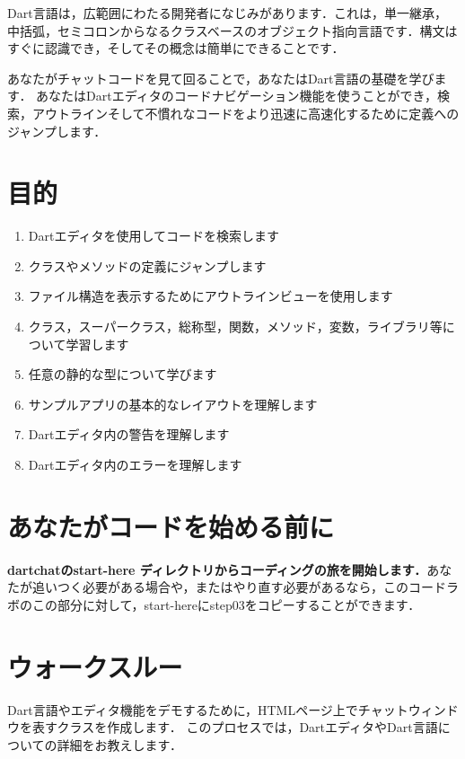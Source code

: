 
Dart言語は，広範囲にわたる開発者になじみがあります．これは，単一継承，中括弧，セミコロンからなるクラスベースのオブジェクト指向言語です．構文はすぐに認識でき，そしてその概念は簡単にできることです．

あなたがチャットコードを見て回ることで，あなたはDart言語の基礎を学びます． あなたはDartエディタのコードナビゲーション機能を使うことができ，検索，アウトラインそして不慣れなコードをより迅速に高速化するために定義へのジャンプします．

\section{目的}

\begin{enumerate}
\item Dartエディタを使用してコードを検索します
\item クラスやメソッドの定義にジャンプします
\item ファイル構造を表示するためにアウトラインビューを使用します
\item クラス，スーパークラス，総称型，関数，メソッド，変数，ライブラリ等について学習します
\item 任意の静的な型について学びます
\item サンプルアプリの基本的なレイアウトを理解します
\item Dartエディタ内の警告を理解します
\item Dartエディタ内のエラーを理解します
\end{enumerate}

\section{あなたがコードを始める前に}

{\bf dartchatのstart-here ディレクトリからコーディングの旅を開始します．}あなたが追いつく必要がある場合や，またはやり直す必要があるなら，このコードラボのこの部分に対して，start-hereにstep03をコピーすることができます．

\section{ウォークスルー}

Dart言語やエディタ機能をデモするために，HTMLページ上でチャットウィンドウを表すクラスを作成します． このプロセスでは，DartエディタやDart言語についての詳細をお教えします．

